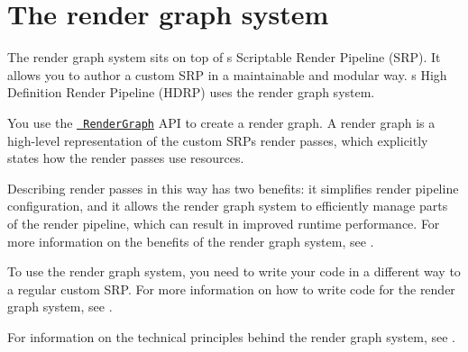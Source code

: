 \chapter{The render graph system}
\hypertarget{md__hey_tea_9_2_library_2_package_cache_2com_8unity_8render-pipelines_8core_0d14_80_88_2_documentation_0i_2render-graph-system}{}\label{md__hey_tea_9_2_library_2_package_cache_2com_8unity_8render-pipelines_8core_0d14_80_88_2_documentation_0i_2render-graph-system}
\label{md__hey_tea_9_2_library_2_package_cache_2com_8unity_8render-pipelines_8core_0d14_80_88_2_documentation_0i_2render-graph-system_autotoc_md1829}%
%
 The render graph system sits on top of \textquotesingle{}s Scriptable Render Pipeline (SRP). It allows you to author a custom SRP in a maintainable and modular way. \textquotesingle{}s High Definition Render Pipeline (HDRP) uses the render graph system.

You use the \href{../api/UnityEngine.Experimental.Rendering.RenderGraphModule.RenderGraph.html}{\texttt{ Render\+Graph}} API to create a render graph. A render graph is a high-\/level representation of the custom SRP\textquotesingle{}s render passes, which explicitly states how the render passes use resources.

Describing render passes in this way has two benefits\+: it simplifies render pipeline configuration, and it allows the render graph system to efficiently manage parts of the render pipeline, which can result in improved runtime performance. For more information on the benefits of the render graph system, see .

To use the render graph system, you need to write your code in a different way to a regular custom SRP. For more information on how to write code for the render graph system, see .

For information on the technical principles behind the render graph system, see .

